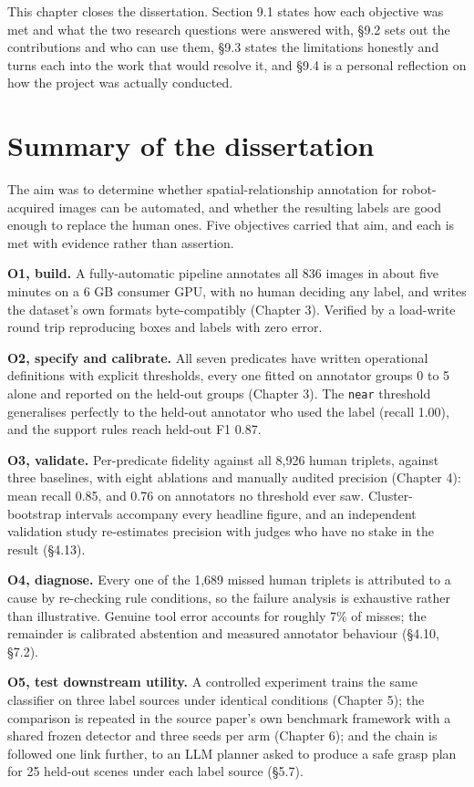
This chapter closes the dissertation. Section 9.1 states how each objective was met and what the two research questions were answered with, \S9.2 sets out the contributions and who can use them, \S9.3 states the limitations honestly and turns each into the work that would resolve it, and \S9.4 is a personal reflection on how the project was actually conducted.

\section{Summary of the dissertation}

The aim was to determine whether spatial-relationship annotation for robot-acquired images can be automated, and whether the resulting labels are good enough to replace the human ones. Five objectives carried that aim, and each is met with evidence rather than assertion.

\textbf{O1, build.} A fully-automatic pipeline annotates all 836 images in about five minutes on a 6 GB consumer GPU, with no human deciding any label, and writes the dataset's own formats byte-compatibly (Chapter 3). Verified by a load-write round trip reproducing boxes and labels with zero error.

\textbf{O2, specify and calibrate.} All seven predicates have written operational definitions with explicit thresholds, every one fitted on annotator groups 0 to 5 alone and reported on the held-out groups (Chapter 3). The \texttt{near} threshold generalises perfectly to the held-out annotator who used the label (recall 1.00), and the support rules reach held-out F1 0.87.

\textbf{O3, validate.} Per-predicate fidelity against all 8,926 human triplets, against three baselines, with eight ablations and manually audited precision (Chapter 4): mean recall 0.85, and 0.76 on annotators no threshold ever saw. Cluster-bootstrap intervals accompany every headline figure, and an independent validation study re-estimates precision with judges who have no stake in the result (\S4.13).

\textbf{O4, diagnose.} Every one of the 1,689 missed human triplets is attributed to a cause by re-checking rule conditions, so the failure analysis is exhaustive rather than illustrative. Genuine tool error accounts for roughly 7\% of misses; the remainder is calibrated abstention and measured annotator behaviour (\S4.10, \S7.2).

\textbf{O5, test downstream utility.} A controlled experiment trains the same classifier on three label sources under identical conditions (Chapter 5); the comparison is repeated in the source paper's own benchmark framework with a shared frozen detector and three seeds per arm (Chapter 6); and the chain is followed one link further, to an LLM planner asked to produce a safe grasp plan for 25 held-out scenes under each label source (\S5.7).

